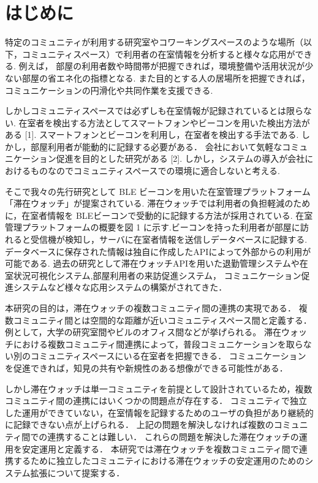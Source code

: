 \thispagestyle{myheadings}

\section{はじめに}
\label{sec:intro}
特定のコミュニティが利用する研究室やコワーキングスペースのような場所（以下，コミュニティスペース）で利用者の在室情報を分析すると様々な応用ができる.
例えば， 部屋の利用者数や時間帯が把握できれば，環境整備や活用状況が少ない部屋の省エネ化の指標となる.
また目的とする人の居場所を把握できれば，コミュニケーションの円滑化や共同作業を支援できる.

しかしコミュニティスペースでは必ずしも在室情報が記録されているとは限らない.
在室者を検出する方法としてスマートフォンやビーコンを用いた検出方法がある [1].
スマートフォンとビーコンを利用し，在室者を検出する手法である.
しかし，部屋利用者が能動的に記録する必要がある．
会社において気軽なコミュニケーション促進を目的とした研究がある [2].
しかし，システムの導入が会社におけるものなのでコミュニティスペースでの環境に適合しないと考える.

そこで我々の先行研究として BLE ビーコンを用いた在室管理プラットフォーム「滞在ウォッチ」が提案されている.
滞在ウォッチでは利用者の負担軽減のために，在室者情報を BLEビーコンで受動的に記録する方法が採用されている.
在室管理プラットフォームの概要を図 1 に示す.ビーコンを持った利用者が部屋に訪れると受信機が検知し，サーバに在室者情報を送信しデータベースに記録する.
データベースに保存された情報は独自に作成したAPIによって外部からの利用が可能である.
過去の研究として滞在ウォッチAPIを用いた退勤管理システムや在室状況可視化システム,部屋利用者の来訪促進システム，
コミュニケーション促進システムなど様々な応用システムの構築がされてきた．

本研究の目的は，滞在ウォッチの複数コミュニティ間の連携の実現である．
複数コミュニティ間とは空間的な距離が近いコミュニティスペース間と定義する．
例として，大学の研究室間やビルのオフィス間などが挙げられる。
滞在ウォッチにおける複数コミュニティ間連携によって，普段コミュニケーションを取らない別のコミュニティスペースにいる在室者を把握できる．
コミュニケーションを促進できれば，知見の共有や新規性のある想像ができる可能性がある．

しかし滞在ウォッチは単一コミュニティを前提として設計されているため，複数コミュニティ間の連携にはいくつかの問題点が存在する．
コミュニティで独立した運用ができていない，在室情報を記録するためのユーザの負担があり継続的に記録できない点が上げられる．
上記の問題を解決しなければ複数のコミュニティ間での連携することは難しい．
これらの問題を解決した滞在ウォッチの運用を安定運用と定義する．
本研究では滞在ウォッチを複数コミュニティ間で連携するために独立したコミュニティにおける滞在ウォッチの安定運用のためのシステム拡張について提案する．